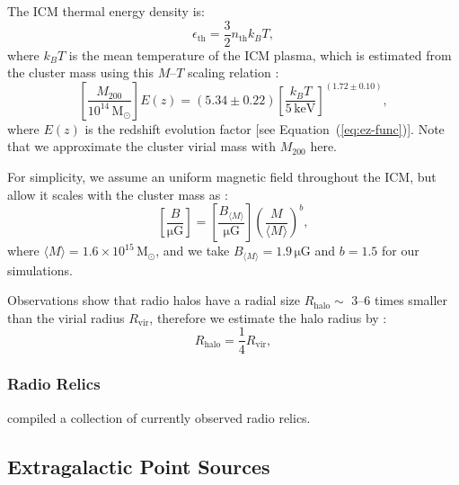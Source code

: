 \documentclass[modern]{aastex61}
\newcommand{\uG}{\mathrm{\mu G}}
\newcommand{\Msun}{\mathrm{M}_{\odot}}
\begin{document}
The ICM thermal energy density is:
\begin{equation}
  \label{eq:eth}
  \epsilon_{\mathrm{th}} = \frac{3}{2} n_{\mathrm{th}} k_B T,
\end{equation}
where $k_B T$ is the mean temperature of the ICM plasma, which is estimated
from the cluster mass using this $M$--$T$ scaling relation \citep{arnaud2005}:
\begin{equation}
  \label{eq:mt-relation}
  \left[ \frac{M_{200}}{10^{14} \,\Msun} \right] E(z) = (5.34 \pm 0.22)
  \left[ \frac{k_B T}{5 \,\mathrm{keV}} \right]^{(1.72 \pm 0.10)},
\end{equation}
where $E(z)$ is the redshift evolution factor [see Equation~(\ref{eq:ez-func})].
Note that we approximate the cluster virial mass with $M_{200}$ here.

For simplicity, we assume an uniform magnetic field throughout the ICM,
but allow it scales with the cluster mass as \citep{cassano2012}:
\begin{equation}
  \label{eq:magfield-mass}
  \left[ \frac{B}{\uG} \right] = \left[ \frac{B_{\langle {M} \rangle}}{\uG} \right]
  \left( \frac{M}{\langle {M} \rangle} \right)^b,
\end{equation}
where $\langle {M} \rangle = 1.6 \times 10^{15} \,\Msun$, and we take
$B_{\langle {M} \rangle} = 1.9 \,\uG$ and $b = 1.5$ for our simulations.

Observations show that radio halos have a radial size
$R_{\mathrm{halo}} \sim$ 3--6 times smaller than the virial radius
$R_{\mathrm{vir}}$, therefore we estimate the halo radius by
\citep{cassano2007,zandanel2014}:
\begin{equation}
  \label{eq:rhalo-rvir}
  R_{\mathrm{halo}} = \frac{1}{4} R_{\mathrm{vir}},
\end{equation}



\subsubsection{Radio Relics}
\label{sec:relic}

\citet[their Table 1]{nuza2017} compiled a collection of currently observed
radio relics.

\subsection{Extragalactic Point Sources}
\label{sec:pointsources}
\end{document}
